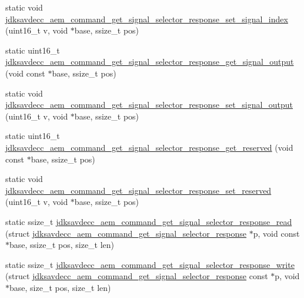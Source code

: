 \begin{DoxyCompactItemize}
static void \hyperlink{group__command__get__signal__selector__response_gaf78c64111e68d05a32ec9e543ce9ec71}{jdksavdecc\+\_\+aem\+\_\+command\+\_\+get\+\_\+signal\+\_\+selector\+\_\+response\+\_\+set\+\_\+signal\+\_\+index} (uint16\+\_\+t v, void $\ast$base, ssize\+\_\+t pos)
\item 
static uint16\+\_\+t \hyperlink{group__command__get__signal__selector__response_ga3960c6b55f6717c0cf314a97ee33c685}{jdksavdecc\+\_\+aem\+\_\+command\+\_\+get\+\_\+signal\+\_\+selector\+\_\+response\+\_\+get\+\_\+signal\+\_\+output} (void const $\ast$base, ssize\+\_\+t pos)
\item 
static void \hyperlink{group__command__get__signal__selector__response_gaaa138d32719cc3c765c5ccdcdba9b039}{jdksavdecc\+\_\+aem\+\_\+command\+\_\+get\+\_\+signal\+\_\+selector\+\_\+response\+\_\+set\+\_\+signal\+\_\+output} (uint16\+\_\+t v, void $\ast$base, ssize\+\_\+t pos)
\item 
static uint16\+\_\+t \hyperlink{group__command__get__signal__selector__response_ga7bafec92fc051d41443e8add99753670}{jdksavdecc\+\_\+aem\+\_\+command\+\_\+get\+\_\+signal\+\_\+selector\+\_\+response\+\_\+get\+\_\+reserved} (void const $\ast$base, ssize\+\_\+t pos)
\item 
static void \hyperlink{group__command__get__signal__selector__response_ga16bbf070b071807dd79bd77cf779f85c}{jdksavdecc\+\_\+aem\+\_\+command\+\_\+get\+\_\+signal\+\_\+selector\+\_\+response\+\_\+set\+\_\+reserved} (uint16\+\_\+t v, void $\ast$base, ssize\+\_\+t pos)
\item 
static ssize\+\_\+t \hyperlink{group__command__get__signal__selector__response_ga568e7c8a8c2571a5d09f90f146a78ca6}{jdksavdecc\+\_\+aem\+\_\+command\+\_\+get\+\_\+signal\+\_\+selector\+\_\+response\+\_\+read} (struct \hyperlink{structjdksavdecc__aem__command__get__signal__selector__response}{jdksavdecc\+\_\+aem\+\_\+command\+\_\+get\+\_\+signal\+\_\+selector\+\_\+response} $\ast$p, void const $\ast$base, ssize\+\_\+t pos, size\+\_\+t len)
\item 
static ssize\+\_\+t \hyperlink{group__command__get__signal__selector__response_gace617c7d68ef5af63100e47c6661c1c6}{jdksavdecc\+\_\+aem\+\_\+command\+\_\+get\+\_\+signal\+\_\+selector\+\_\+response\+\_\+write} (struct \hyperlink{structjdksavdecc__aem__command__get__signal__selector__response}{jdksavdecc\+\_\+aem\+\_\+command\+\_\+get\+\_\+signal\+\_\+selector\+\_\+response} const $\ast$p, void $\ast$base, size\+\_\+t pos, size\+\_\+t len)
\end{DoxyCompactItemize}


